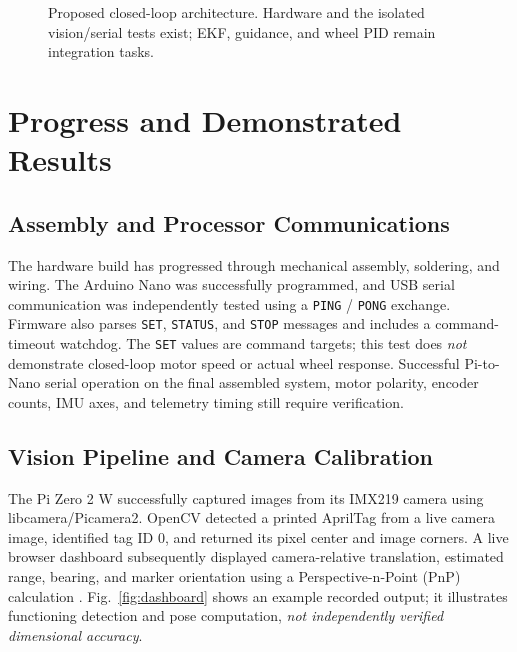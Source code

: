 \documentclass[conference,letterpaper,10pt]{IEEEtran}
\begin{document}
\begin{figure}[t]
\centering
{}
\caption{Proposed closed-loop architecture. Hardware and the isolated vision/serial tests exist; EKF, guidance, and wheel PID remain integration tasks.}
\label{fig:architecture}
\end{figure}

\section{Progress and Demonstrated Results}
\subsection{Assembly and Processor Communications}
The hardware build has progressed through mechanical assembly, soldering, and wiring. The Arduino Nano was successfully programmed, and USB serial communication was independently tested using a \texttt{PING} / \texttt{PONG} exchange. Firmware also parses \texttt{SET}, \texttt{STATUS}, and \texttt{STOP} messages and includes a command-timeout watchdog. The \texttt{SET} values are command targets; this test does \emph{not} demonstrate closed-loop motor speed or actual wheel response. Successful Pi-to-Nano serial operation on the final assembled system, motor polarity, encoder counts, IMU axes, and telemetry timing still require verification.

\subsection{Vision Pipeline and Camera Calibration}
The Pi Zero 2 W successfully captured images from its IMX219 camera using libcamera/Picamera2. OpenCV detected a printed AprilTag from a live camera image, identified tag ID 0, and returned its pixel center and image corners. A live browser dashboard subsequently displayed camera-relative translation, estimated range, bearing, and marker orientation using a Perspective-n-Point (PnP) calculation \cite{olson2011,opencvcalib}. Fig.~\ref{fig:dashboard} shows an example recorded output; it illustrates functioning detection and pose computation, \emph{not independently verified dimensional accuracy}.
\end{document}
